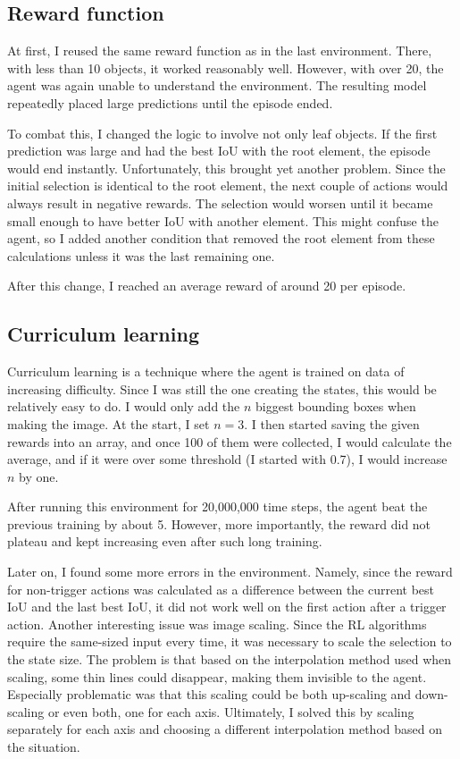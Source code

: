 \documentclass[
  digital,     %
  oneside,     %
  nosansbold,  %
  nocolorbold, %
  lof,         %
  lot,         %
]{fithesis4}
\begin{document}
\subsection{Reward function}

At first, I reused the same reward function as in the last environment. There, with less than 10 objects, it worked reasonably well. However, with over 20, the agent was again unable to understand the environment. The resulting model repeatedly placed large predictions until the episode ended.

To combat this, I changed the logic to involve not only leaf objects. If the first prediction was large and had the best IoU with the root element, the episode would end instantly. Unfortunately, this brought yet another problem. Since the initial selection is identical to the root element, the next couple of actions would always result in negative rewards. The selection would worsen until it became small enough to have better IoU with another element. This might confuse the agent, so I added another condition that removed the root element from these calculations unless it was the last remaining one.

After this change, I reached an average reward of around 20 per episode.

\subsection{Curriculum learning}

Curriculum learning is a technique where the agent is trained on data of increasing difficulty. Since I was still the one creating the states, this would be relatively easy to do. I would only add the $n$ biggest bounding boxes when making the image. At the start, I set $n=3$. I then started saving the given rewards into an array, and once 100 of them were collected, I would calculate the average, and if it were over some threshold (I started with 0.7), I would increase $n$ by one.

After running this environment for 20,000,000 time steps, the agent beat the previous training by about 5. However, more importantly, the reward did not plateau and kept increasing even after such long training.

Later on, I found some more errors in the environment. Namely, since the reward for non-trigger actions was calculated as a difference between the current best IoU and the last best IoU, it did not work well on the first action after a trigger action.
Another interesting issue was image scaling. Since the RL algorithms require the same-sized input every time, it was necessary to scale the selection to the state size. The problem is that based on the interpolation method used when scaling, some thin lines could disappear, making them invisible to the agent. Especially problematic was that this scaling could be both up-scaling and down-scaling or even both, one for each axis. Ultimately, I solved this by scaling separately for each axis and choosing a different interpolation method based on the situation.
\end{document}
